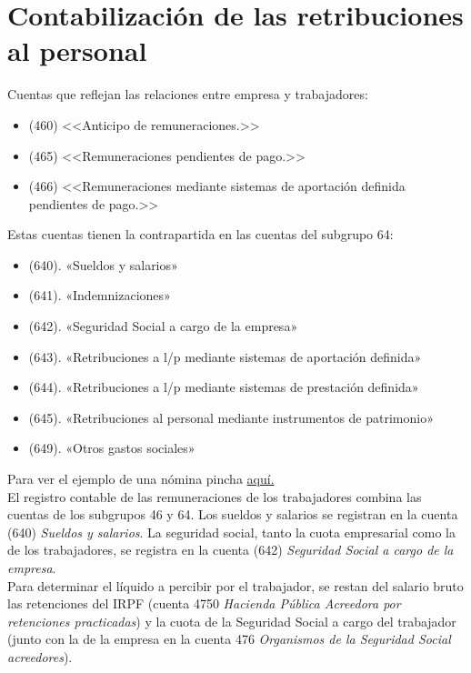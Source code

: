 \documentclass[a4paper,12pt]{article}
\begin{document}
\newpage
\section{Contabilización de las retribuciones al personal}

Cuentas que reflejan las relaciones entre empresa y trabajadores:
\begin{itemize}
    \item (460) <<Anticipo de remuneraciones.>>
    \item (465) <<Remuneraciones pendientes de pago.>>
    \item (466) <<Remuneraciones mediante sistemas de aportación definida pendientes de pago.>>
\end{itemize}

Estas cuentas tienen la contrapartida en las cuentas del subgrupo 64:
\begin{itemize}
    \item (640). «Sueldos y salarios»
    \item (641). «Indemnizaciones»
    \item (642). «Seguridad Social a cargo de la empresa»
    \item (643). «Retribuciones a l/p mediante sistemas de aportación definida»
    \item (644). «Retribuciones a l/p mediante sistemas de prestación definida»
    \item (645). «Retribuciones al personal mediante instrumentos de patrimonio»
    \item (649). «Otros gastos sociales»
\end{itemize}

Para ver el ejemplo de una nómina pincha \href{https://github.com/ElblogdeIsmael/ElblogdeIsmael.github.io/blob/main/Subjects/Third/CF1/Resumenes/Tema4/FCCEE/images/partes_nomina.png}{aquí.}\\

\newpage
El registro contable de las remuneraciones de los trabajadores combina las cuentas de los subgrupos 46 y 64. Los sueldos y salarios se registran en la cuenta (640) \textit{Sueldos y salarios}. La seguridad social, tanto la cuota empresarial como la de los trabajadores, se registra en la cuenta (642) \textit{Seguridad Social a cargo de la empresa}.\\

Para determinar el líquido a percibir por el trabajador, se restan del salario bruto las retenciones del IRPF (cuenta 4750 \textit{Hacienda Pública Acreedora por retenciones practicadas}) y la cuota de la Seguridad Social a cargo del trabajador (junto con la de la empresa en la cuenta 476 \textit{Organismos de la Seguridad Social acreedores}).\\
\end{document}
